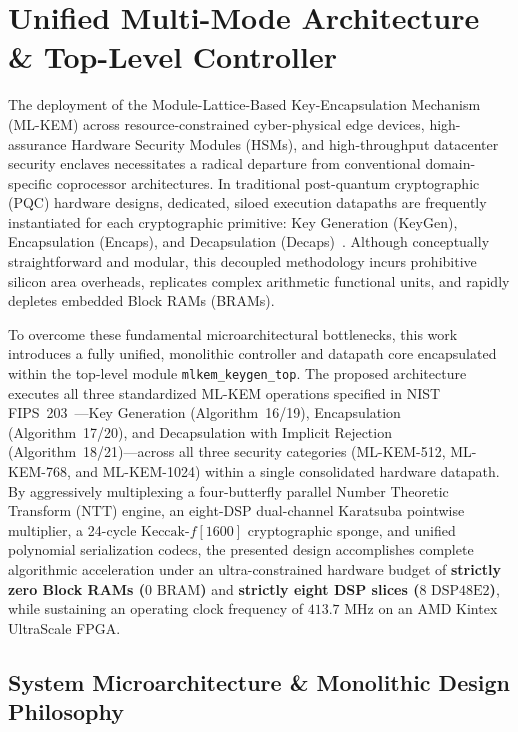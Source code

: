 \section{Unified Multi-Mode Architecture \& Top-Level Controller}
\label{sec:architecture}

The deployment of the Module-Lattice-Based Key-Encapsulation Mechanism (\mbox{ML-KEM}) across resource-constrained cyber-physical edge devices, high-assurance Hardware Security Modules (HSMs), and high-throughput datacenter security enclaves necessitates a radical departure from conventional domain-specific coprocessor architectures. In traditional post-quantum cryptographic (PQC) hardware designs, dedicated, siloed execution datapaths are frequently instantiated for each cryptographic primitive: Key Generation (\mbox{KeyGen}), Encapsulation (\mbox{Encaps}), and Decapsulation (\mbox{Decaps})~\cite{xing2023tcas1, imran2022tvlsi}. Although conceptually straightforward and modular, this decoupled methodology incurs prohibitive silicon area overheads, replicates complex arithmetic functional units, and rapidly depletes embedded Block RAMs (BRAMs).

To overcome these fundamental microarchitectural bottlenecks, this work introduces a fully unified, monolithic controller and datapath core encapsulated within the top-level module \texttt{mlkem\_keygen\_top}. The proposed architecture executes all three standardized \mbox{ML-KEM} operations specified in NIST FIPS~203~\cite{fips203}---Key Generation (Algorithm~16/19), Encapsulation (Algorithm~17/20), and Decapsulation with Implicit Rejection (Algorithm~18/21)---across all three security categories (\mbox{ML-KEM-512}, \mbox{ML-KEM-768}, and \mbox{ML-KEM-1024}) within a single consolidated hardware datapath. By aggressively multiplexing a four-butterfly parallel Number Theoretic Transform ($\text{NTT}$) engine, an eight-DSP dual-channel Karatsuba pointwise multiplier, a 24-cycle $\text{Keccak-}f[1600]$ cryptographic sponge, and unified polynomial serialization codecs, the presented design accomplishes complete algorithmic acceleration under an ultra-constrained hardware budget of \textbf{strictly zero Block RAMs ($0\text{ BRAM}$)} and \textbf{strictly eight DSP slices ($8\text{ DSP48E2}$)}, while sustaining an operating clock frequency of $413.7\text{ MHz}$ on an AMD Kintex UltraScale FPGA.

\subsection{System Microarchitecture \& Monolithic Design Philosophy}
\label{sec:arch_microarchitecture}

